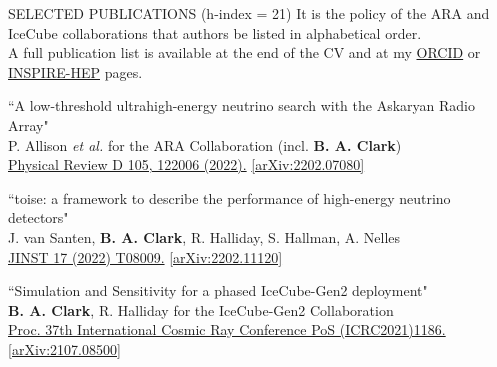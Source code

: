 \documentclass{resume} %
\begin{document}
\newpage
\begin{rSection}{SELECTED PUBLICATIONS (h-index = 21)}
It is the policy of the ARA and IceCube collaborations that authors be listed in alphabetical order. \\  A full publication list is available at the end of the CV and at my \href{https://orcid.org/0000-0003-4089-2245}{ORCID}  or  \href{https://inspirehep.net/author/profile/Brian.A.Clark.1}{INSPIRE-HEP} pages.

\begin{etaremune}%

  \item ``A low-threshold ultrahigh-energy neutrino search with the Askaryan Radio Array" \\
 P. Allison {\it et al.} for the ARA Collaboration (incl. \textbf{B. A. Clark})\\ \href{https://doi.org/10.1103/PhysRevD.105.122006}{Physical Review D 105, 122006 (2022).}  \href{https://arxiv.org/abs/2202.07080}{[arXiv:2202.07080]}


  \item ``toise: a framework to describe the performance of high-energy neutrino detectors" \\
 J. van Santen, \textbf{B. A. Clark}, R. Halliday, S. Hallman, A. Nelles \\  \href{https://doi.org/10.1088/1748-0221/17/08/T08009}{JINST 17 (2022) T08009.}  \href{https://arxiv.org/abs/2202.11120}{[arXiv:2202.11120]}


  \item ``Simulation and Sensitivity for a phased IceCube-Gen2 deployment" \\
 \textbf{B. A. Clark}, R. Halliday for the IceCube-Gen2 Collaboration \\ \href{https://doi.org/10.22323/1.395.1186}{Proc. 37th International Cosmic Ray Conference PoS (ICRC2021)1186.}  \href{https://arxiv.org/abs/2107.08500}{[arXiv:2107.08500]}
 


\end{etaremune}
\end{rSection}
\end{document}
